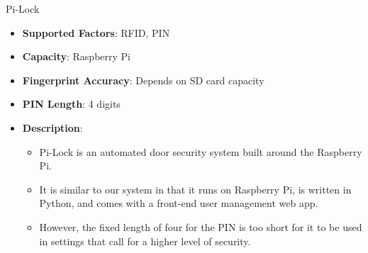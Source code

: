 \begin{frame}{Pi-Lock}
\begin{itemize}
    \item<1-> \textbf{Supported Factors}: RFID, PIN 
    \item<2-> \textbf{Capacity}: Raspberry Pi
    \item<3-> \textbf{Fingerprint Accuracy}: Depends on SD card capacity
    \item<4-> \textbf{PIN Length}: 4 digits
    \item<5-> \textbf{Description}:
    \begin{itemize}
	    \item<6-> \scriptsize{Pi-Lock is an automated door security system built around the Raspberry Pi.}
	    \item<7-> \scriptsize{It is similar to our system in that it runs on Raspberry Pi, is written in Python, and comes with a front-end user management web app.}
	    \item<8-> \scriptsize{However, the fixed length of four for the PIN is too short for it to be used in settings that call for a higher level of security.} 
	\end{itemize}
\end{itemize}
\end{frame}

